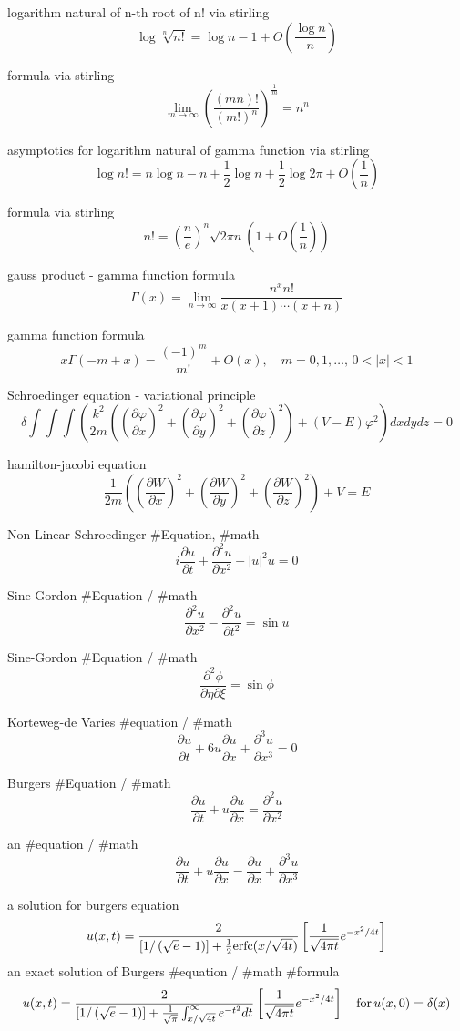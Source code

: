 logarithm natural of n-th root of n! via stirling
$$
\log \sqrt[n]{n!}=\log n-1+O\left(\frac{\log n}{n}\right)
$$

formula via stirling
$$
\lim_{m\rightarrow\infty}\left(\frac{(mn)!}{(m!)^n}\right)^{\frac{1}{m}}=n^n
$$

asymptotics for logarithm natural of gamma function via stirling
$$
\log n!=n\log n-n+\frac{1}{2}\log n+\frac{1}{2}\log 2\pi+O\left(\frac{1}{n}\right)
$$

formula via stirling
$$
n!=\left(\frac{n}{e}\right)^n\sqrt{2\pi n}\left(1+O\left(\frac{1}{n}\right)\right)
$$

gauss product - gamma function formula
$$
\Gamma(x)=\lim_{n\rightarrow\infty}\frac{n^x n!}{x(x+1)\cdots(x+n)}
$$

gamma function formula
$$
x \Gamma(-m+x)=\frac{(-1)^m}{m!}+O(x), \quad m=0,1,\ldots, \, 0<|x|<1
$$

Schroedinger equation - variational principle
$$
\delta \int\int\int\left(\frac{k^2}{2m}\left(\left(\frac{\partial \varphi}{\partial x}\right)^2+\left(\frac{\partial \varphi}{\partial y}\right)^2+\left(\frac{\partial \varphi}{\partial z}\right)^2\right)+(V-E)\varphi^2\right)dxdydz=0
$$


hamilton-jacobi equation
$$
\frac{1}{2m}\left(\left(\frac{\partial W}{\partial x}\right)^2+\left(\frac{\partial W}{\partial y}\right)^2+\left(\frac{\partial W}{\partial z}\right)^2\right)+V=E
$$


Non Linear Schroedinger #Equation, #math
$$
i \frac{\partial u}{\partial t}+\frac{\partial^2 u}{\partial x^2}+|u|^2u=0
$$

Sine-Gordon #Equation / #math 
$$
\frac{\partial^2 u}{\partial x^2}-\frac{\partial^2 u}{\partial t^2}=\sin u
$$

Sine-Gordon #Equation / #math 
$$
\frac{\partial^2 \phi}{\partial \eta \partial \xi}=\sin \phi
$$

Korteweg-de Varies #equation / #math
$$
\frac{\partial u}{\partial t}+6u\frac{\partial u}{\partial x}+\frac{\partial^3 u}{\partial x^3}=0
$$

Burgers #Equation / #math
$$
\frac{\partial u}{\partial t}+u\frac{\partial u}{\partial x}=\frac{\partial^2 u}{\partial x^2}
$$

an #equation / #math 
$$
\frac{\partial u}{\partial t}+u\frac{\partial u}{\partial x}=\frac{\partial u}{\partial x}+\frac{\partial^3 u}{\partial x^3}
$$

a solution for burgers equation
$$
u(x,t)=\frac{2}{\left[1/\left(\sqrt{e}-1\right)\right]+\frac{1}{2}{\rm erfc}(x/\sqrt{4t})}\left[\frac{1}{\sqrt{4\pi t}}e^{-x^2/4t}\right]
$$
an exact solution of Burgers #equation / #math #formula 
$$
u(x,t)=\frac{2}{\left[1/\left(\sqrt{e}-1\right)\right]+\frac{1}{\sqrt{\pi}}\int^\infty_{x/\sqrt{4t}}e^{-t^2}dt}\left[\frac{1}{\sqrt{4\pi t}}e^{-x^2/4t}\right] \quad {\rm for}\, u(x,0)=\delta(x)
$$

